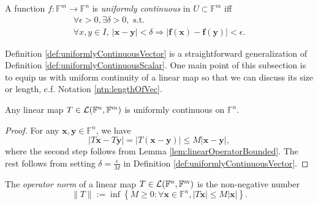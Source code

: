 \begin{defn}
  \label{def:uniformlyContinuousVector}
  A function $f: \mathbb{F}^m\rightarrow \mathbb{F}^n$
  is \emph{uniformly continuous} in $U\subset \mathbb{F}^m$
  iff
   \begin{equation}
     \label{eq:uniformlyContinuousVector}
     \begin{array}{l}
     \forall \epsilon>0, \exists \delta>0,\text{ s.t. }
     \\
     \forall x,y\in I,\ 
       |\mathbf{x}-\mathbf{y}|<\delta \Rightarrow
       |\mathbf{f}(\mathbf{x})-\mathbf{f}(\mathbf{y})|<\epsilon.
     \end{array}
   \end{equation}
\end{defn}

\begin{rem}
  Definition \ref{def:uniformlyContinuousVector}
  is a straightforward generalization
  of Definition \ref{def:uniformlyContinuousScalar}.
  One main point of this subsection is to
  equip us with uniform continuity of a linear map
  so that we can discuss its size or length, c.f. Notation \ref{ntn:lengthOfVec}.
\end{rem}

\begin{coro}
  \label{coro:linearMapIsUniformlyCont}
  Any linear map
  $T\in {\cal L}(\mathbb{F}^n,\mathbb{F}^m)$
  is uniformly continuous on $\mathbb{F}^n$.
\end{coro}
\begin{proof}
  For any $\mathbf{x},\mathbf{y}\in \mathbb{F}^n$,
  we have
  \begin{displaymath}
    |T\mathbf{x} - T\mathbf{y}|
    = |T(\mathbf{x} - \mathbf{y})|
    \le M |\mathbf{x} - \mathbf{y}|,
  \end{displaymath}
  where the second step follows
  from Lemma \ref{lem:linearOperatorBounded}. 
  The rest follows from setting $\delta = \frac{\epsilon}{M}$
  in Definition \ref{def:uniformlyContinuousVector}.
\end{proof}

\begin{defn}
  \label{def:operatorNorm}
  The \emph{operator norm} of a linear map
  \mbox{$T\in {\cal L}(\mathbb{F}^n,\mathbb{F}^m)$}
  is the non-negative number %
  \begin{equation}
    \label{eq:operatorNorm}
    \|T\| := \inf%
    \left\{
      M\ge 0 : \forall \mathbf{x}\in \mathbb{F}^n,
      |T\mathbf{x}| \le M |\mathbf{x}|
    \right\}.
  \end{equation}
\end{defn}

